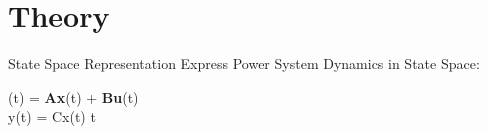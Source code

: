 \section[Theory]{Theory}
\label{sec:lasso_theory}

\begin{frame}[fragile]{State Space Representation}
	Express Power System Dynamics in State Space:
	\begin{multiline}
		\label{eq:ssr}
		(t) = \textbf{A}\textbf{x}(t)
		+ \textbf{B}\textbf{u}(t)\\
		 y(t) = Cx(t) \forall t
	\end{multiline}
\end{frame}